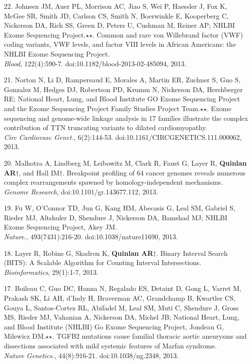 \documentclass[margin,line]{cv}
\begin{document}
\begin{resume}
\begin{list}{*}{}
    \item[22.] Johnsen JM, Auer PL, Morrison AC, Jiao S, Wei P, Haessler J, Fox K, McGee SR, Smith JD, Carlson CS, Smith N, Boerwinkle E, Kooperberg C, Nickerson DA, Rich SS, Green D, Peters U, Cushman M, Reiner AP; NHLBI Exome Sequencing Project.$\star$$\star$. Common and rare von Willebrand factor (VWF) coding variants, VWF levels, and factor VIII levels in African Americans: the NHLBI Exome Sequencing Project.\\
    \emph{Blood}, 122(4):590-7. doi:10.1182/blood-2013-02-485094, 2013.

    \item[21.] Norton N, Li D, Rampersaud E, Morales A, Martin ER, Zuchner S, Guo S, Gonzalez M, Hedges DJ, Robertson PD, Krumm N, Nickerson DA, Hershberger RE; National Heart, Lung, and Blood Institute GO Exome Sequencing Project and the Exome Sequencing Project Family Studies Project Team.$\star$$\star$. Exome sequencing and genome-wide linkage analysis in 17 families illustrate the complex contribution of TTN truncating variants to dilated cardiomyopathy.\\
    \emph{Circ Cardiovasc Genet.}, 6(2):144-53. doi:10.1161/CIRCGENETICS.111.000062, 2013.

    \item[20.] Malhotra A, Lindberg M, Leibowitz M, Clark R, Faust G, Layer R, \textbf{Quinlan AR}$\dagger$, and Hall IM$\dagger$.
    Breakpoint profiling of 64 cancer genomes reveals numerous complex rearrangements spawned by homology-independent mechanisms. \\
    \emph{Genome Research}, doi:10.1101/gr.143677.112, 2013.

    \item[19.] Fu W, O'Connor TD, Jun G, Kang HM, Abecasis G, Leal SM, Gabriel S, Rieder MJ, Altshuler D, Shendure J, Nickerson DA, Bamshad MJ; NHLBI Exome Sequencing Project, Akey JM.\\
    \emph{Nature.}, 493(7431):216-20. doi:10.1038/nature11690, 2013.

    \item[18.] Layer R, Robins G, Skadron K, \textbf{Quinlan AR}$\dagger$.
    Binary Interval Search (BITS): A Scalable Algorithm for Counting Interval Intersections.\\
    \emph{Bioinformatics}, 29(1):1-7, 2013.

    \item[17.] Boileau C, Guo DC, Hanna N, Regalado ES, Detaint D, Gong L, Varret M, Prakash SK, Li AH, d'Indy H, Braverman AC, Grandchamp B, Kwartler CS, Gouya L, Santos-Cortez RL, Abifadel M, Leal SM, Muti C, Shendure J, Gross MS, Rieder MJ, Vahanian A, Nickerson DA, Michel JB; National Heart, Lung, and Blood Institute (NHLBI) Go Exome Sequencing Project, Jondeau G, Milewicz DM.$\star$$\star$. TGFB2 mutations cause familial thoracic aortic aneurysms and dissections associated with mild systemic features of Marfan syndrome.\\
    \emph{Nature Genetics.}, 44(8):916-21. doi:10.1038/ng.2348, 2013.


\end{list}
\end{resume}
\end{document}
